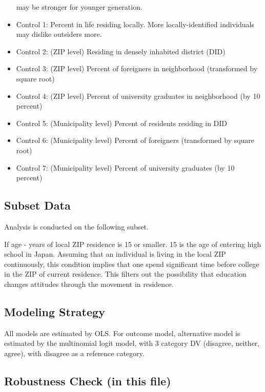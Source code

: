 \documentclass[
]{article}
\begin{document}
\begin{itemize}
  may be stronger for younger generation.
\item
  Control 1: Percent in life residing locally. More locally-identified
  individuals may dislike outsiders more.
\item
  Control 2: (ZIP level) Residing in densely inhabited district (DID)
\item
  Control 3: (ZIP level) Percent of foreigners in neighborhood
  (transformed by square root)\\
\item
  Control 4: (ZIP level) Percent of university graduates in neighborhood
  (by 10 percent)
\item
  Control 5: (Municipality level) Percent of residents residing in DID
\item
  Control 6: (Municipality level) Percent of foreigners (transformed by
  square root)
\item
  Control 7: (Municipality level) Percent of university graduates (by 10
  percent)
\end{itemize}

\hypertarget{subset-data}{%
\subsection{Subset Data}\label{subset-data}}

Analysis is conducted on the following subset.

If age - years of local ZIP residence is 15 or smaller. 15 is the age of
entering high school in Japan. Assuming that an individual is living in
the local ZIP continuously, this condition implies that one spend
significant time before college in the ZIP of current residence. This
filters out the possibility that education changes attitudes through the
movement in residence.

\hypertarget{modeling-strategy}{%
\subsection{Modeling Strategy}\label{modeling-strategy}}

All models are estimated by OLS. For outcome model, alternative model is
estimated by the multinomial logit model, with 3 category DV (disagree,
neither, agree), with disagree as a reference category.

\hypertarget{robustness-check-in-this-file}{%
\subsection{Robustness Check (in this
file)}\label{robustness-check-in-this-file}}
\end{document}
